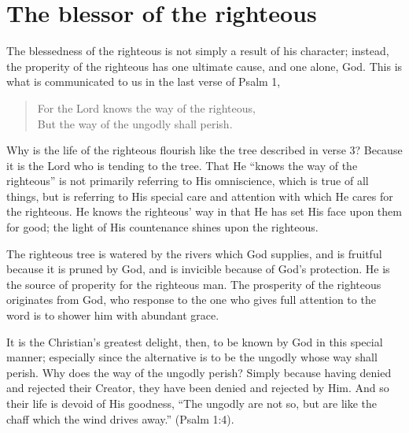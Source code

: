 \documentclass[a5paper]{book}
\newcommand{\Q}[1]{\begin{quote}#1\end{quote}}
\begin{document}
\section{The blessor of the righteous}
The blessedness of the righteous is not simply a result of his character;
    instead, the properity of the righteous has one ultimate cause, and one alone,
    God.
This is what is communicated to us in the last verse of Psalm 1,
    \Q{For the Lord knows the way of the righteous, \\
    But the way of the ungodly shall perish.}

Why is the life of the righteous flourish like the tree
    described in verse 3?
Because it is the Lord who is tending to the tree.
That He ``knows the way of the righteous'' is not primarily
    referring to His omniscience, which is true of all things,
    but is referring to His special care and attention 
    with which He cares for the righteous.
He knows the righteous' way in that He has set His face upon them for good;
    the light of His countenance shines upon the righteous.

The righteous tree is watered by the rivers which God supplies,
    and is fruitful because it is pruned by God,
    and is invicible because of God's protection.
He is the source of properity for the righteous man.  
The prosperity of the righteous originates from God,
    who response to the one who gives full attention to the word
    is to shower him with abundant grace.

It is the Christian's greatest delight, then,
    to be known by God in this special manner;
    especially since the alternative is to be the ungodly
    whose way shall perish.
Why does the way of the ungodly perish?
Simply because having denied and rejected their Creator,
    they have been denied and rejected by Him.
And so their life is devoid of His goodness,
    ``The ungodly are not so,
    but are like the chaff which the wind drives away.''
    (Psalm 1:4).

\end{document}
